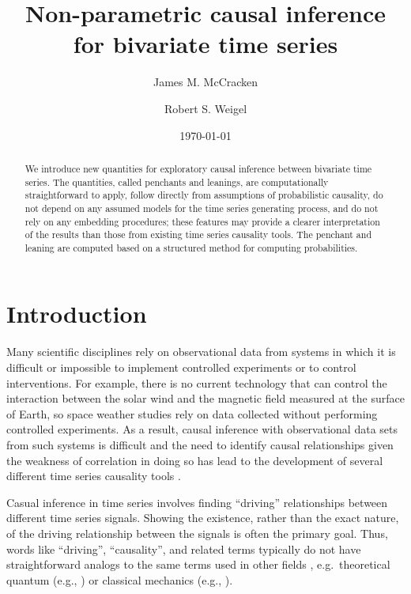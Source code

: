 \documentclass[twocolumn,aps,pre,groupedaddress]{revtex4-1}
\begin{document}
\title{Non-parametric causal inference for bivariate time series}
\author{James M. McCracken}
\author{Robert S. Weigel}
\date{\today}

\begin{abstract}
We introduce new quantities for exploratory causal inference between bivariate time series.  The quantities, called penchants and leanings, are computationally straightforward to apply, follow directly from assumptions of probabilistic causality, do not depend on any assumed models for the time series generating process, and do not rely on any embedding procedures; these features may provide a clearer interpretation of the results than those from existing time series causality tools.  The penchant and leaning are computed based on a structured method for computing probabilities.
\end{abstract}

\maketitle

\section{Introduction}
Many scientific disciplines rely on observational data from systems in which it is difficult or impossible to implement controlled experiments or to control interventions. For example, there is no current technology that can control the interaction between the solar wind and the magnetic field measured at the surface of Earth, so space weather studies rely on data collected without performing controlled experiments.  As a result, causal inference with observational data sets from such systems is difficult and the need to identify causal relationships given the weakness of correlation in doing so has lead to the development of several different time series causality tools \cite{Schreiber2000,granger1969,Rogosa1980,Pearl2000,kleinberg2012}.

Casual inference in time series involves finding ``driving'' relationships between different time series signals.  Showing the existence, rather than the exact nature, of the driving relationship between the signals is often the primary goal.  Thus, words like ``driving'', ``causality'', and related terms typically do not have straightforward analogs to the same terms used in other fields \cite{Granger1980,liu2012,Roberts1985}, e.g.\, theoretical quantum (e.g., \cite{Peres1995}) or classical mechanics (e.g., \cite{Bunge1979}).
\end{document}
